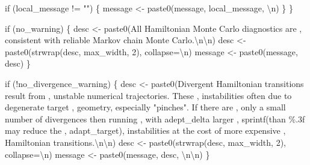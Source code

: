 \documentclass[
  letterpaper,
  DIV=11,
  numbers=noendperiod]{scrartcl}
\newenvironment{Shaded}{\begin{snugshade}}{\end{snugshade}}
\newcommand{\AttributeTok}[1]{\textcolor[rgb]{0.40,0.45,0.13}{#1}}
\newcommand{\ControlFlowTok}[1]{\textcolor[rgb]{0.00,0.23,0.31}{#1}}
\newcommand{\DecValTok}[1]{\textcolor[rgb]{0.68,0.00,0.00}{#1}}
\newcommand{\FunctionTok}[1]{\textcolor[rgb]{0.28,0.35,0.67}{#1}}
\newcommand{\NormalTok}[1]{\textcolor[rgb]{0.00,0.23,0.31}{#1}}
\newcommand{\OtherTok}[1]{\textcolor[rgb]{0.00,0.23,0.31}{#1}}
\newcommand{\SpecialCharTok}[1]{\textcolor[rgb]{0.37,0.37,0.37}{#1}}
\newcommand{\StringTok}[1]{\textcolor[rgb]{0.13,0.47,0.30}{#1}}
\begin{document}
\begin{Shaded}
\begin{Highlighting}[]
    \ControlFlowTok{if}\NormalTok{ (local\_message }\SpecialCharTok{!=} \StringTok{""}\NormalTok{) \{}
\NormalTok{      message }\OtherTok{\textless{}{-}} \FunctionTok{paste0}\NormalTok{(message, local\_message, }\StringTok{\textquotesingle{}}\SpecialCharTok{\textbackslash{}n}\StringTok{\textquotesingle{}}\NormalTok{)}
\NormalTok{    \}}
\NormalTok{  \}}

  \ControlFlowTok{if}\NormalTok{ (no\_warning) \{}
\NormalTok{    desc }\OtherTok{\textless{}{-}} \FunctionTok{paste0}\NormalTok{(}\StringTok{\textquotesingle{}All Hamiltonian Monte Carlo diagnostics are \textquotesingle{}}\NormalTok{,}
                   \StringTok{\textquotesingle{}consistent with reliable Markov chain Monte Carlo.}\SpecialCharTok{\textbackslash{}n\textbackslash{}n}\StringTok{\textquotesingle{}}\NormalTok{)}
\NormalTok{    desc }\OtherTok{\textless{}{-}} \FunctionTok{paste0}\NormalTok{(}\FunctionTok{strwrap}\NormalTok{(desc, max\_width, }\DecValTok{2}\NormalTok{), }\AttributeTok{collapse=}\StringTok{\textquotesingle{}}\SpecialCharTok{\textbackslash{}n}\StringTok{\textquotesingle{}}\NormalTok{)}
\NormalTok{    message }\OtherTok{\textless{}{-}} \FunctionTok{paste0}\NormalTok{(message, desc)}
\NormalTok{  \}}
  
  \ControlFlowTok{if}\NormalTok{ (}\SpecialCharTok{!}\NormalTok{no\_divergence\_warning) \{}
\NormalTok{    desc }\OtherTok{\textless{}{-}} \FunctionTok{paste0}\NormalTok{(}\StringTok{\textquotesingle{}Divergent Hamiltonian transitions result from \textquotesingle{}}\NormalTok{,}
                   \StringTok{\textquotesingle{}unstable numerical trajectories.  These \textquotesingle{}}\NormalTok{,}
                   \StringTok{\textquotesingle{}instabilities often due to degenerate target \textquotesingle{}}\NormalTok{,}
                   \StringTok{\textquotesingle{}geometry, especially "pinches".  If there are \textquotesingle{}}\NormalTok{,}
                   \StringTok{\textquotesingle{}only a small number of divergences then running \textquotesingle{}}\NormalTok{,}
                   \StringTok{\textquotesingle{}with adept\_delta larger \textquotesingle{}}\NormalTok{,}
                   \FunctionTok{sprintf}\NormalTok{(}\StringTok{\textquotesingle{}than \%.3f may reduce the \textquotesingle{}}\NormalTok{, adapt\_target),}
                   \StringTok{\textquotesingle{}instabilities at the cost of more expensive \textquotesingle{}}\NormalTok{,}
                   \StringTok{\textquotesingle{}Hamiltonian transitions.}\SpecialCharTok{\textbackslash{}n\textbackslash{}n}\StringTok{\textquotesingle{}}\NormalTok{)}
\NormalTok{    desc }\OtherTok{\textless{}{-}} \FunctionTok{paste0}\NormalTok{(}\FunctionTok{strwrap}\NormalTok{(desc, max\_width, }\DecValTok{2}\NormalTok{), }\AttributeTok{collapse=}\StringTok{\textquotesingle{}}\SpecialCharTok{\textbackslash{}n}\StringTok{\textquotesingle{}}\NormalTok{)}
\NormalTok{    message }\OtherTok{\textless{}{-}} \FunctionTok{paste0}\NormalTok{(message, desc, }\StringTok{\textquotesingle{}}\SpecialCharTok{\textbackslash{}n\textbackslash{}n}\StringTok{\textquotesingle{}}\NormalTok{)}
\NormalTok{  \}}


\end{Highlighting}
\end{Shaded}
\end{document}
